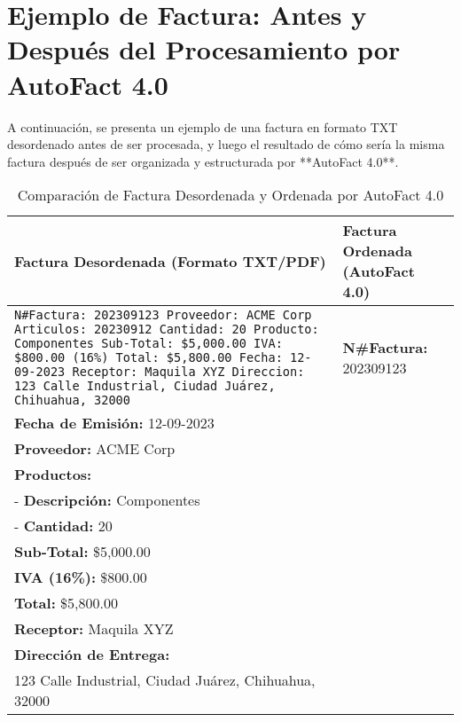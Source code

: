 \section{Ejemplo de Factura: Antes y Después del Procesamiento por AutoFact 4.0}

A continuación, se presenta un ejemplo de una factura en formato TXT desordenado antes de ser procesada, y luego el resultado de cómo sería la misma factura después de ser organizada y estructurada por **AutoFact 4.0**.

\begin{table}[H]
\centering
\caption{Comparación de Factura Desordenada y Ordenada por AutoFact 4.0}
\begin{tabularx}{\textwidth}{|X|X|}
\hline
\textbf{Factura Desordenada (Formato TXT/PDF)} & \textbf{Factura Ordenada (AutoFact 4.0)} \\ \hline
\texttt{N\#Factura:  202309123   \hspace{1.2cm}   \\
Proveedor: ACME Corp\\
Articulos:\\
20230912\hspace{0.5cm} Cantidad: 20 \hspace{0.8cm} Producto: Componentes\\
Sub-Total: \$5,000.00\\
IVA: \$800.00 \hspace{2cm}  (16\%)\\
Total:   \$5,800.00   Fecha: 12-09-2023\\
Receptor: Maquila XYZ\\
Direccion:\\ 123 Calle Industrial,\\ Ciudad Juárez, Chihuahua, 32000\\} 
& 
\textbf{N\#Factura:} 202309123 \\
\textbf{Fecha de Emisión:} 12-09-2023 \\
\textbf{Proveedor:} ACME Corp \\
\textbf{Productos:} \\
- \textbf{Descripción:} Componentes \\
- \textbf{Cantidad:} 20 \\
\textbf{Sub-Total:} \$5,000.00 \\
\textbf{IVA (16\%):} \$800.00 \\
\textbf{Total:} \$5,800.00 \\
\textbf{Receptor:} Maquila XYZ \\
\textbf{Dirección de Entrega:} \\
123 Calle Industrial, Ciudad Juárez, Chihuahua, 32000 \\ \hline
\end{tabularx}
\end{table}

